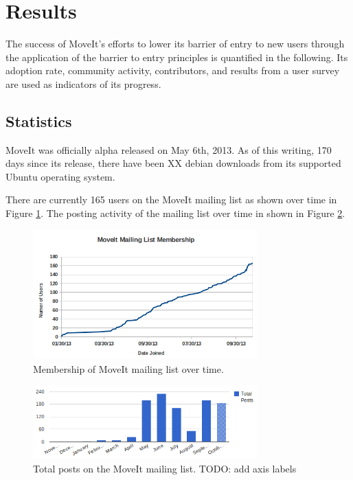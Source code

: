 \documentclass[10pt,journal,compsoc]{joser1}
\begin{document}
{\section{Results}
\label{sec::results}

The success of MoveIt's efforts to lower its barrier of entry to new users through the application of the barrier to entry principles is quantified in the following. Its adoption rate, community activity, contributors, and results from a user survey are used as indicators of its progress.

\subsection{Statistics}
\label{sec::statistics}

MoveIt was officially alpha released on May 6th, 2013. As of this writing, 170 days since its release, there have been XX debian downloads from its supported Ubuntu operating system.

There are currently 165 users on the MoveIt mailing list as shown over time in Figure \ref{fig:membership_plot}. The posting activity of the mailing list over time in shown in Figure \ref{fig:mailing_list}.

\begin{figure}[!t]
\centering
\includegraphics[width=3.4in]{images/membership_plot}
\caption{Membership of MoveIt mailing list over time.}
\label{fig:membership_plot}
\end{figure}

\begin{figure}[!t]
\centering
\includegraphics[width=3.4in]{images/mailing_list}
\caption{Total posts on the MoveIt mailing list. TODO: add axis labels}
\label{fig:mailing_list}
\end{figure}

}
\end{document}
